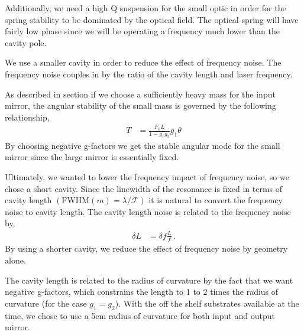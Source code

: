 %
%

Additionally, we need a high Q suspension for the small optic in order for the
spring stability to be dominated by the optical field.
The optical spring will have fairly low phase since we will be operating a
frequency much lower than the cavity pole.



%
%

We use a smaller cavity in order to reduce the effect of frequency noise.
The frequency noise couples in by the ratio of the cavity length and
laser frequency.


%
%

As described in section  if we choose a sufficiently heavy mass for the
input mirror, the angular stability of the small mass is governed by the
following relationship,
\begin{align}
T &= \frac{F_0 L}{1 - g_1 g_2} g_1 \theta
\end{align}
By choosing negative g-factors we get the stable angular mode for the small
mirror since the large mirror is essentially fixed.


%
%

Ultimately, we wanted to lower the frequency impact of frequency noise, so we
chose a short cavity.
Since the linewidth of the resonance is fixed in terms of cavity length
$ ( \mathrm{FWHM}(m) = \lambda / \mathcal{F} ) $ it is
natural to convert the frequency noise to cavity length.
The cavity length noise is related to the frequency noise by,
\begin{align}
\delta L &= \delta f \frac{L}{f} \, .
\end{align}
By using a shorter cavity, we reduce the effect of frequency noise by geometry
alone.

The cavity length is related to the radius of curvature by the fact that we want
negative g-factors, which constrains the length to 1 to 2 times the radius of
curvature (for the case $g_1 = g_2$).
With the off the shelf substrates available at the time, we chose to use a 5cm
radius of curvature for both input and output mirror.

